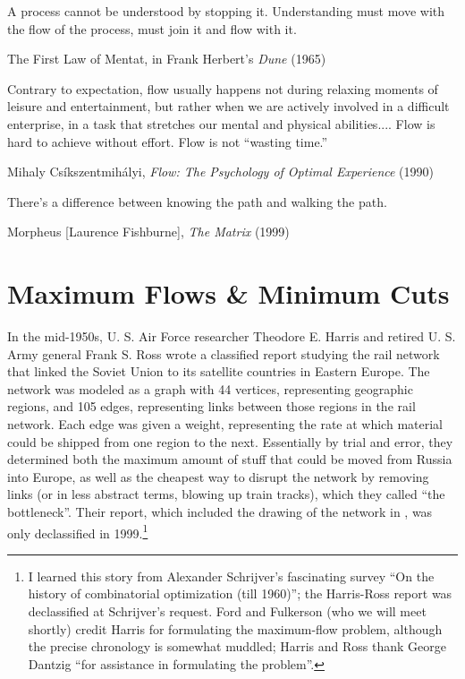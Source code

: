 \epigraph{A process cannot be understood by stopping it. Understanding must move with
the flow of the process, must join it and flow with it.
}{The First Law of Mentat, in Frank Herbert’s \textit{Dune} (1965)}

\epigraph{Contrary to expectation, flow usually happens not during relaxing moments of
leisure and entertainment, but rather when we are actively involved in a difficult
enterprise, in a task that stretches our mental and physical abilities.... Flow is hard
to achieve without effort. Flow is not “wasting time.”
}{Mihaly Csíkszentmihályi, \textit{Flow: The Psychology of Optimal Experience} (1990)}

\epigraph{There’s a difference between knowing the path and walking the path.
}{Morpheus [Laurence Fishburne], \textit{The Matrix} (1999)}

\chapter{Maximum Flows \& Minimum Cuts}
\label{ch:10}

In the mid-1950s, U. S. Air Force researcher Theodore E. Harris and retired U. S. Army general Frank S. Ross wrote a classified report studying the rail network that linked the Soviet Union to its satellite countries in Eastern Europe. The network was modeled as a graph with 44 vertices, representing geographic regions, and 105 edges, representing links between those regions in the rail network. Each edge was given a weight, representing the rate at which material could be shipped from one region to the next. Essentially by trial and error, they determined both the maximum amount of stuff that could be moved from Russia into Europe, as well as the cheapest way to disrupt the network by removing links (or in less abstract terms, blowing up train tracks), which they called “the bottleneck”. Their report, which included the drawing of the network in , was only declassified in 1999.\footnote{I learned this story from Alexander Schrijver’s fascinating survey “On the history of
combinatorial optimization (till 1960)”; the Harris-Ross report was declassified at Schrijver’s
request. Ford and Fulkerson (who we will meet shortly) credit Harris for formulating the
maximum-flow problem, although the precise chronology is somewhat muddled; Harris and Ross
thank George Dantzig “for assistance in formulating the problem”.}

